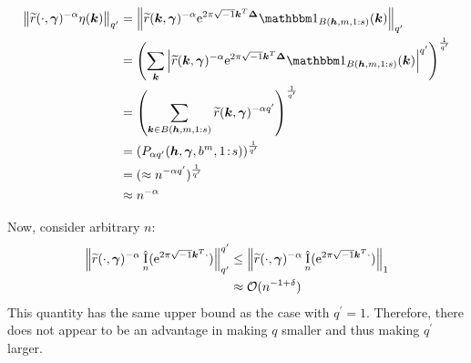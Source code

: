 \documentclass[authoryear]{elsarticle}
\newcommand{\tr}{\widetilde{r}}
\DeclareMathOperator{\appxint}{\hat{I}}
\newcommand{\onetos}{1\!:\!s}
\newcommand{\LarysaNote}[1]{{\color{violet}#1}}
\begin{document}
\begin{align*}
    \norm[q'] {\tr(\cdot,\vgamma)^{-\alpha} \eta(\vk)} 
    &= \norm[q'] {\tr(\vk,\vgamma)^{-\alpha} \me^{2 \pi \sqrt{-1} \vk^T \vDelta}\bbone_{B(\vh,m,1:s)}(\vk) } \\
    &=  \left( \sum_{\vk} \abs{\tr(\vk,\vgamma)^{-\alpha} \me^{2 \pi \sqrt{-1} \vk^T \vDelta}\bbone_{B(\vh,m,1:s)}(\vk)}^{q'}\right)^{\frac{1}{q'}} \\
    &= \left(\sum_{\vk \in B(\vh,m,1:s)} \tr(\vk,\vgamma)^{-\alpha q'}\right)^{\frac{1}{q'}} \\
    &= \left( P_{\alpha q'}(\vh,\vgamma,b^m,\onetos) \right)^{\frac{1}{q'}} \\
    &= (\approx n^{-\alpha q'})^{\frac{1}{q'}} \\
    & \approx n^{-\alpha}
\end{align*}



Now, consider arbitrary $n$:
\begin{align*}
    \norm[q'] {\tr(\cdot,\vgamma)^{-\alpha} \appxint_n(\me^{2 \pi \sqrt{-1} \vk^T \cdot})}^{q'} 
    &\leq  \norm[1] {\tr(\cdot,\vgamma)^{-\alpha} \appxint_n(\me^{2 \pi \sqrt{-1} \vk^T \cdot})} \\ 
    &  \approx \Order(n^{-1+\delta}) %
\end{align*}
This quantity has the same upper bound as the case with $q^{'} = 1$. Therefore, there does not appear to be an advantage in making $q$ smaller and thus making $q^{'}$ larger. 
\end{document}
